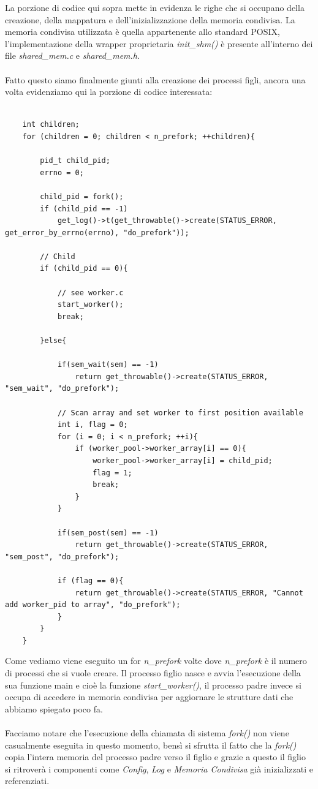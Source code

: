 \documentclass[italian]{tktltiki2}
\begin{document}
La porzione di codice qui sopra mette in evidenza le righe che si occupano della creazione, della mappatura e dell'inizializzazione della memoria condivisa. La memoria condivisa utilizzata è quella appartenente allo standard POSIX, l'implementazione della wrapper proprietaria \emph{init\_shm()} è presente all'interno dei file \emph{shared\_mem.c} e \emph{shared\_mem.h}.\\\\
Fatto questo siamo finalmente giunti alla creazione dei processi figli, ancora una volta evidenziamo qui la porzione di codice interessata:

\begin{lstlisting}
	
    int children;
    for (children = 0; children < n_prefork; ++children){

        pid_t child_pid;
        errno = 0;

        child_pid = fork();
        if (child_pid == -1)
            get_log()->t(get_throwable()->create(STATUS_ERROR, get_error_by_errno(errno), "do_prefork"));

        // Child 
        if (child_pid == 0){

            // see worker.c
            start_worker();
            break;

        }else{
            
            if(sem_wait(sem) == -1)
                return get_throwable()->create(STATUS_ERROR, "sem_wait", "do_prefork");

            // Scan array and set worker to first position available
            int i, flag = 0;
            for (i = 0; i < n_prefork; ++i){
                if (worker_pool->worker_array[i] == 0){
                    worker_pool->worker_array[i] = child_pid;
                    flag = 1;
                    break;
                }
            }

            if(sem_post(sem) == -1)
                return get_throwable()->create(STATUS_ERROR, "sem_post", "do_prefork");

            if (flag == 0){
                return get_throwable()->create(STATUS_ERROR, "Cannot add worker_pid to array", "do_prefork");        
            }            
        }
    }
\end{lstlisting}
Come vediamo viene eseguito un for \emph{n\_prefork} volte dove \emph{n\_prefork} è il numero di processi che si vuole creare. Il processo figlio nasce e avvia l'esecuzione della sua funzione main e cioè la funzione \emph{start\_worker()}, il processo padre invece si occupa di accedere in memoria condivisa per aggiornare le strutture dati che abbiamo spiegato poco fa. \\\\Facciamo notare che l'esecuzione della chiamata di sistema \emph{fork()} non viene casualmente eseguita in questo momento, bensì si sfrutta il fatto che la \emph{fork()} copia l'intera memoria del processo padre verso il figlio e grazie a questo il figlio si ritroverà i componenti come \emph{Config}, \emph{Log} e \emph{Memoria Condivisa} già inizializzati e referenziati.
\end{document}

